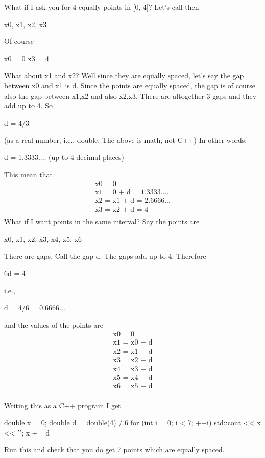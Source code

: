 What if I ask you for 4 equally points in [0, 4]?
Let's call then
\begin{center}
x0, x1, x2, x3
\end{center}
Of course
\begin{center}
x0 = 0
x3 = 4
\end{center}
What about x1 and x2? Well since they are equally spaced,
let's say the gap between x0 and x1 is d. Since the
points are equally spaced, the gap is of course also the gap between
x1,x2 and also x2,x3. There are altogether 3 gaps and they add up to 4.
So
\begin{center}
d = 4/3
\end{center}
(as a real number, i.e., double. The above is math, not C++) In other
words:
\begin{center}
d = 1.3333.... (up to 4 decimal places)
\end{center}
This mean that
\begin{align*}
\text{x0 = 0}\\
\text{x1 = 0 + d = 1.3333....}\\
\text{x2 = x1 + d = 2.6666...}\\
\text{x3 = x2 + d = 4}\\
\end{align*}
What if I want  points in the same interval? Say the points
are
\begin{center}
x0, x1, x2, x3, x4, x5, x6
\end{center}
There are  gaps. Call the gap d. The gaps add up to 4.
Therefore
\begin{center}
6d = 4
\end{center}
i.e.,
\begin{center}
d = 4/6 = 0.6666...
\end{center}
and the values of the points are
\begin{align*}
\text{x0 = 0}\\
\text{x1 = x0 + d}\\
\text{x2 = x1 + d}\\
\text{x3 = x2 + d}\\
\text{x4 = x3 + d}\\
\text{x5 = x4 + d}\\
\text{x6 = x5 + d}\\
\end{align*}

Writing this as a C++ program I get
\begin{console}
double x = 0;
double d = double(4) / 6
for (int i = 0; i < 7; ++i)
{   
    std::cout << x << '\n';
    x += d
}
\end{console}
Run this and check that you do get 7 points which are equally spaced.

